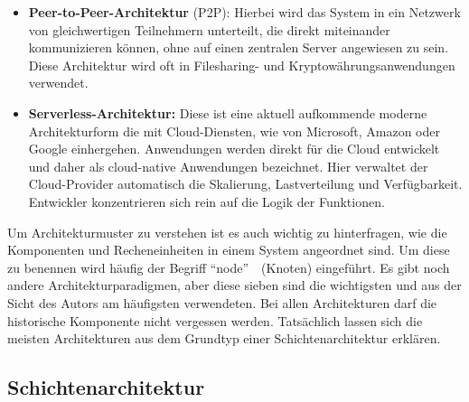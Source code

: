 \documentclass[../vs-script-first-v01.tex]{subfiles}
\begin{document}
\begin{itemize}
\item \textbf{Peer-to-Peer-Architektur} (P2P): Hierbei wird das System in ein Netzwerk von gleichwertigen Teilnehmern unterteilt, die direkt miteinander kommunizieren können, ohne auf einen zentralen Server angewiesen zu sein. Diese Architektur wird oft in Filesharing- und Kryptowährungsanwendungen verwendet.

\item \textbf{Serverless-Architektur:} Diese ist eine aktuell aufkommende moderne Architekturform die mit Cloud-Diensten, wie von Microsoft, Amazon oder Google einhergehen. Anwendungen werden direkt für die Cloud entwickelt und daher als cloud-native Anwendungen bezeichnet. Hier verwaltet der Cloud-Provider automatisch die Skalierung, Lastverteilung und Verfügbarkeit. Entwickler konzentrieren sich rein auf die Logik der Funktionen. 
\end{itemize}  
Um Architekturmuster zu verstehen ist es auch wichtig zu hinterfragen, wie die Komponenten und Recheneinheiten in einem System angeordnet sind. Um diese zu benennen wird häufig der Begriff \enquote{node}~\cite{tanenbaum2017distributed}~(Knoten) eingeführt.
Es gibt noch andere Architekturparadigmen, aber diese sieben sind die wichtigsten und aus der Sicht des Autors am häufigsten verwendeten. Bei allen Architekturen darf die historische Komponente nicht vergessen werden. Tatsächlich lassen sich die meisten Architekturen aus dem Grundtyp einer Schichtenarchitektur erklären. 

\subsection{Schichtenarchitektur}
\end{document}
